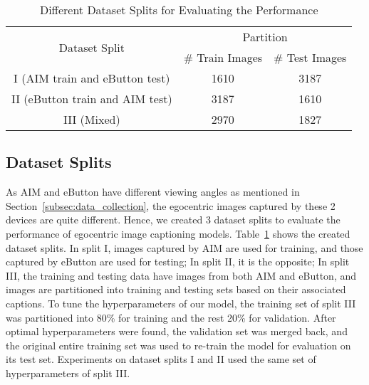 \documentclass[journal]{IEEEtran}
\begin{document}
\begin{table}[!t]
\centering
\caption{Different Dataset Splits for Evaluating the Performance}
\label{tab:dataset_split_info}
\begin{tabular}{@{}ccc@{}}
\toprule
\multirow{2}{*}{Dataset Split} & \multicolumn{2}{c}{Partition}       \\ \cmidrule(l){2-3} 
                               & \# Train Images & \# Test Images \\ \midrule
I (AIM train and eButton test)                  & 1610               & 3187           \\
II (eButton train and AIM test)             & 3187               & 1610           \\
III (Mixed)                           & 2970               & 1827               \\ \bottomrule
\end{tabular}%
\end{table}




\subsection{Dataset Splits}

As AIM and eButton have different viewing angles as mentioned in Section~\ref{subsec:data_collection}, the egocentric images captured by these 2 devices are quite different. Hence, we created 3 dataset splits to evaluate the performance of egocentric image captioning models. Table~\ref{tab:dataset_split_info} shows the created dataset splits. In split I, images captured by AIM are used for training, and those captured by eButton are used for testing; In split II, it is the opposite; In split III, the training and testing data have images from both AIM and eButton, and images are partitioned into training and testing sets based on their associated captions. To tune the hyperparameters of our model, the training set of split III was partitioned into 80\% for training and the rest 20\% for validation. After optimal hyperparameters were found, the validation set was merged back, and the original entire training set was used to re-train the model for evaluation on its test set. Experiments on dataset splits I and II used the same set of hyperparameters of split III.
\end{document}
